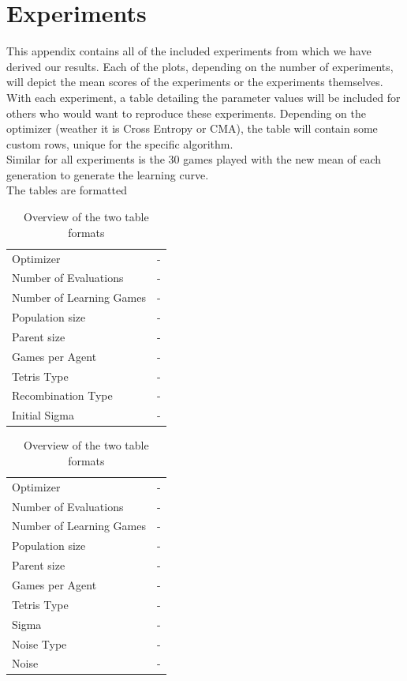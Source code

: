 \section{Experiments}
This appendix contains all of the included experiments from which we have derived our results. Each of the plots, depending on the number of experiments, will depict the mean scores of the experiments or the experiments themselves.\\
With each experiment, a table detailing the parameter values will be included for others who would want to reproduce these experiments. Depending on the optimizer (weather it is Cross Entropy or CMA), the table will contain some custom rows, unique for the specific algorithm.\\
Similar for all experiments is the 30 games played with the new mean of each generation to generate the learning curve.\\
The tables are formatted 
\begin{table}[h]
\centering
\caption{Overview of the two table formats}
\begin{tabular}{l r}
Optimizer & -\\
Number of Evaluations & -\\
Number of Learning Games & -\\
Population size& -\\
Parent size & -\\
Games per Agent & -\\
Tetris Type & -\\
\hline
Recombination Type & -\\
Initial Sigma & -
\end{tabular}
\quad
\begin{tabular}{l r}
Optimizer & -\\
Number of Evaluations & -\\
Number of Learning Games & -\\
Population size & -\\
Parent size & -\\
Games per Agent & -\\
Tetris Type & -\\
\hline
Sigma & -\\
Noise Type & -\\
Noise & -
\end{tabular}
\end{table}

\clearpage

